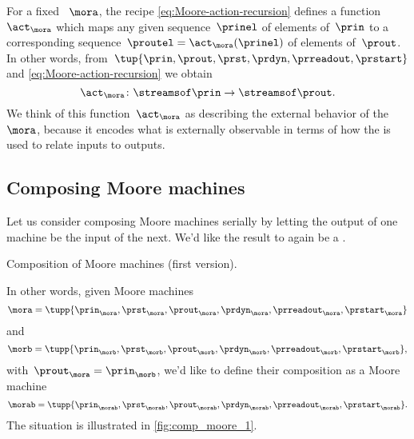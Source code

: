 For a fixed ~$\mora$, the recipe \cref{eq:Moore-action-recursion} defines a function~$\act_\mora$ which maps any given sequence~$\prinel$ of elements of~$\prin$ to a corresponding sequence~$\proutel = \act_\mora(\prinel)$ of elements of~$\prout$.
In other words, from~$\tup{\prin, \prout, \prst, \prdyn, \prreadout, \prstart}$ and \cref{eq:Moore-action-recursion} we obtain
\begin{equation}
    \act_\mora \colon \streamsof\prin  \to \streamsof\prout.
\end{equation}
We think of this function~$\act_\mora$ as describing the external behavior of the ~$\mora$, because it encodes what is externally observable in terms of how the  is used to relate inputs to outputs.


\subsection{Composing Moore machines}

Let us consider composing Moore machines serially by letting the output of one machine be the input of the next.
We'd like the result to again be a .

\begin{marginfigure}
    \centering
    \caption{Composition of Moore machines (first version).}
    \label{fig:comp_moore_1}
\end{marginfigure}

In other words, given Moore machines
%
\begin{equation}
    \label{eq:moore-mora}
    \mora = \tupp{\prin_{\mora},\prst_{\mora},\prout_{\mora},\prdyn_{\mora},\prreadout_{\mora},\prstart_{\mora}}
\end{equation}
%
and
%
\begin{equation}
    \label{eq:moore-morb}
    \morb = \tupp{\prin_{\morb},\prst_{\morb},\prout_{\morb},\prdyn_{\morb},\prreadout_{\morb},\prstart_{\morb}},
\end{equation}
with~$\prout_{\mora} = \prin_{\morb}$, we'd like to define their composition as a Moore machine
\begin{equation}
    \morab = \tupp{\prin_{\morab},\prst_{\morab},\prout_{\morab},\prdyn_{\morab},\prreadout_{\morab},\prstart_{\morab}}.
\end{equation}
The situation is illustrated in \cref{fig:comp_moore_1}.

